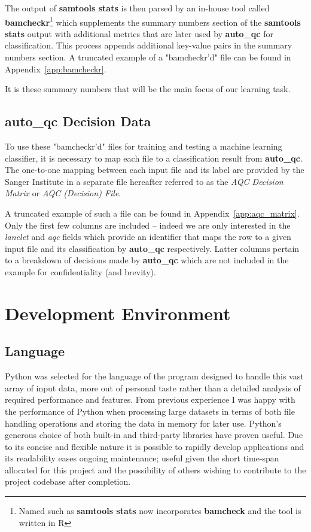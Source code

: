 The output of \textbf{samtools stats} is then parsed by an in-house tool called
\textbf{bamcheckr}\footnote{Named such as \textbf{samtools stats} now incorporates
\textbf{bamcheck} and the tool is written in R} which supplements the summary
numbers section of the \textbf{samtools stats} output with additional metrics
that are later used by \textbf{auto\_qc} for classification.  This process
appends additional key-value pairs in the summary numbers section.  A truncated
example of a "bamcheckr'd" file can be found in Appendix~\ref{app:bamcheckr}.

It is these summary numbers that will be the main focus of our learning task.


\subsection{auto\_qc Decision Data}

To use these "bamcheckr'd" files for training and testing a machine learning
classifier, it is necessary to map each file to a classification result from
\textbf{auto\_qc}. The one-to-one mapping between each input file and its label
are provided by the Sanger Institute in a separate file hereafter referred to as
the \textit{AQC Decision Matrix} or \textit{AQC (Decision) File}.

A truncated example of such a file can be found in
Appendix~\ref{app:aqc_matrix}.  Only the first few columns are included --
indeed we are only interested in the \textit{lanelet} and \textit{aqc} fields
which provide an identifier that maps the row to a given input file and its
classification by \textbf{auto\_qc} respectively.  Latter columns pertain to a
breakdown of decisions made by \textbf{auto\_qc} which are not included in the
example for confidentiality (and brevity).


\section{Development Environment}
\subsection{Language}
\label{part1:dev:lang}

Python was selected for the language of the program designed to handle this vast
array of input data, more out of personal taste rather than a detailed analysis
of required performance and features. From previous experience I was happy with
the performance of Python when processing large datasets in terms of both
file handling operations and storing the data in memory for later use. Python's
generous choice of both built-in and third-party libraries have proven useful.
Due to its concise and flexible nature it is possible to rapidly
develop applications and its readability eases ongoing maintenance; useful given
the short time-span allocated for this project and the possibility of others
wishing to contribute to the project codebase after completion.

